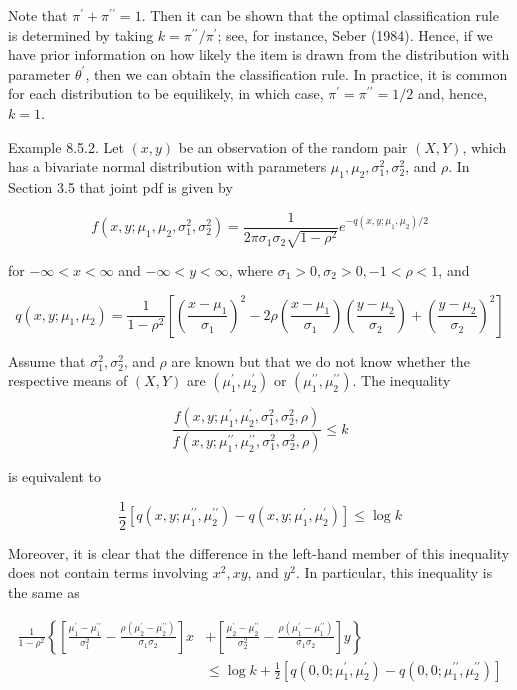 Note that $\pi^{\prime}+\pi^{\prime \prime}=1$. Then it can be shown that the optimal classification rule is determined by taking $k=\pi^{\prime \prime} / \pi^{\prime}$; see, for instance, Seber (1984). Hence, if we have prior information on how likely the item is drawn from the distribution with parameter $\theta^{\prime}$, then we can obtain the classification rule. In practice, it is common for each distribution to be equilikely, in which case, $\pi^{\prime}=\pi^{\prime \prime}=1 / 2$ and, hence, $k=1$.

Example 8.5.2. Let $(x, y)$ be an observation of the random pair $(X, Y)$, which has a bivariate normal distribution with parameters $\mu_{1}, \mu_{2}, \sigma_{1}^{2}, \sigma_{2}^{2}$, and $\rho$. In Section 3.5 that joint pdf is given by

$$
f\left(x, y ; \mu_{1}, \mu_{2}, \sigma_{1}^{2}, \sigma_{2}^{2}\right)=\frac{1}{2 \pi \sigma_{1} \sigma_{2} \sqrt{1-\rho^{2}}} e^{-q\left(x, y ; \mu_{1}, \mu_{2}\right) / 2}
$$

for $-\infty<x<\infty$ and $-\infty<y<\infty$, where $\sigma_{1}>0, \sigma_{2}>0,-1<\rho<1$, and

$$
q\left(x, y ; \mu_{1}, \mu_{2}\right)=\frac{1}{1-\rho^{2}}\left[\left(\frac{x-\mu_{1}}{\sigma_{1}}\right)^{2}-2 \rho\left(\frac{x-\mu_{1}}{\sigma_{1}}\right)\left(\frac{y-\mu_{2}}{\sigma_{2}}\right)+\left(\frac{y-\mu_{2}}{\sigma_{2}}\right)^{2}\right]
$$

Assume that $\sigma_{1}^{2}, \sigma_{2}^{2}$, and $\rho$ are known but that we do not know whether the respective means of $(X, Y)$ are $\left(\mu_{1}^{\prime}, \mu_{2}^{\prime}\right)$ or $\left(\mu_{1}^{\prime \prime}, \mu_{2}^{\prime \prime}\right)$. The inequality

$$
\frac{f\left(x, y ; \mu_{1}^{\prime}, \mu_{2}^{\prime}, \sigma_{1}^{2}, \sigma_{2}^{2}, \rho\right)}{f\left(x, y ; \mu_{1}^{\prime \prime}, \mu_{2}^{\prime \prime}, \sigma_{1}^{2}, \sigma_{2}^{2}, \rho\right)} \leq k
$$

is equivalent to

$$
\frac{1}{2}\left[q\left(x, y ; \mu_{1}^{\prime \prime}, \mu_{2}^{\prime \prime}\right)-q\left(x, y ; \mu_{1}^{\prime}, \mu_{2}^{\prime}\right)\right] \leq \log k
$$

Moreover, it is clear that the difference in the left-hand member of this inequality does not contain terms involving $x^{2}, x y$, and $y^{2}$. In particular, this inequality is the same as

$$
\begin{aligned}
\frac{1}{1-\rho^{2}}\left\{\left[\frac{\mu_{1}^{\prime}-\mu_{1}^{\prime \prime}}{\sigma_{1}^{2}}-\frac{\rho\left(\mu_{2}^{\prime}-\mu_{2}^{\prime \prime}\right)}{\sigma_{1} \sigma_{2}}\right] x\right. & \left.+\left[\frac{\mu_{2}^{\prime}-\mu_{2}^{\prime \prime}}{\sigma_{2}^{2}}-\frac{\rho\left(\mu_{1}^{\prime}-\mu_{1}^{\prime \prime}\right)}{\sigma_{1} \sigma_{2}}\right] y\right\} \\
& \leq \log k+\frac{1}{2}\left[q\left(0,0 ; \mu_{1}^{\prime}, \mu_{2}^{\prime}\right)-q\left(0,0 ; \mu_{1}^{\prime \prime}, \mu_{2}^{\prime \prime}\right)\right]
\end{aligned}
$$

